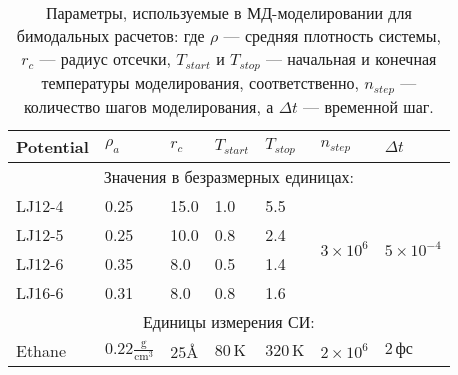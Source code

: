 \begin{table}[]
  \centering
  \begin{tabular}{|lllllcl|}
    \hline
    \multicolumn{1}{|l|}{Potential} & \multicolumn{1}{l|}{$\rho_a$} & \multicolumn{1}{l|}{$r_c$} & \multicolumn{1}{l|}{$T_{start}$} & \multicolumn{1}{l|}{$T_{stop}$} & \multicolumn{1}{l|}{$n_{step}$}                       & $\Delta t$                          \\ \hline
    \multicolumn{7}{|c|}{Значения в безразмерных единицах:}                                                                                                                                                                                                         \\ \hline
    \multicolumn{1}{|l|}{LJ12-4}    & \multicolumn{1}{l|}{0.25}     & \multicolumn{1}{l|}{15.0}  & \multicolumn{1}{l|}{1.0}         & \multicolumn{1}{l|}{5.5}        & \multicolumn{1}{c|}{\multirow{4}{*}{$3 \times 10^6$}} & \multirow{4}{*}{$5 \times 10^{-4}$} \\ \cline{1-5}
    \multicolumn{1}{|l|}{LJ12-5}    & \multicolumn{1}{l|}{0.25}     & \multicolumn{1}{l|}{10.0}  & \multicolumn{1}{l|}{0.8}         & \multicolumn{1}{l|}{2.4}        & \multicolumn{1}{c|}{}                                 &                                     \\ \cline{1-5}
    \multicolumn{1}{|l|}{LJ12-6}    & \multicolumn{1}{l|}{0.35}     & \multicolumn{1}{l|}{8.0}   & \multicolumn{1}{l|}{0.5}         & \multicolumn{1}{l|}{1.4}        & \multicolumn{1}{c|}{}                                 &                                     \\ \cline{1-5}
    \multicolumn{1}{|l|}{LJ16-6}    & \multicolumn{1}{l|}{0.31}     & \multicolumn{1}{l|}{8.0}   & \multicolumn{1}{l|}{0.8}         & \multicolumn{1}{l|}{1.6}        & \multicolumn{1}{c|}{}                                 &                                     \\ \hline
    \multicolumn{7}{|c|}{Единицы измерения СИ:}                                                                                                                                                                                                                     \\ \hline
    \multicolumn{1}{|l|}{Ethane}    & \multicolumn{1}{l|}{$0.22\mathrm{\frac{g}{cm^3}}$}     & \multicolumn{1}{l|}{$25\text{\AA}$}    & \multicolumn{1}{l|}{$80\,\mathrm{K}$}          & \multicolumn{1}{l|}{$320\,\mathrm{K}$}        & \multicolumn{1}{l|}{$2 \times 10^6$}                  & $2\,\mathrm{\text{фс}}$                                   \\ \hline
  \end{tabular}
  \caption{Параметры, используемые в МД-моделировании для бимодальных расчетов: где $\rho$ — средняя плотность системы, $r_c$ — радиус отсечки, $T_{start}$ и $T_{stop}$ — начальная и конечная температуры моделирования, соответственно, $n_{step}$ — количество шагов моделирования, а $\Delta t$ — временной шаг.}
  \label{MACR-Table1}
\end{table}


